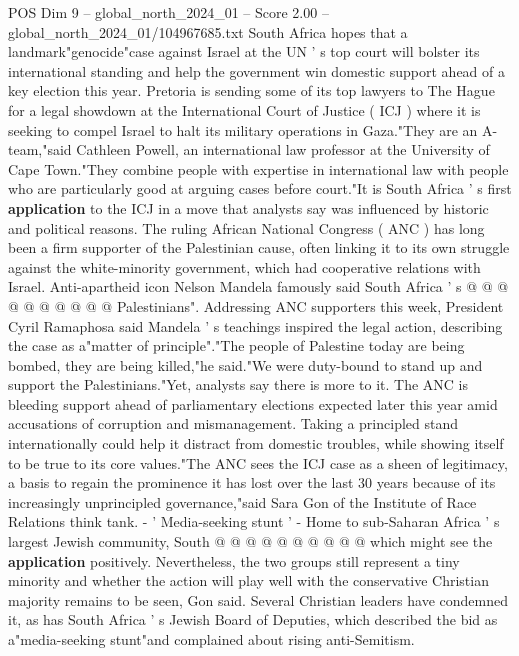 \begin{textsample}{POS Dim 9 – global\_north\_2024\_01 – Score 2.00 – global\_north\_2024\_01/104967685.txt}  \label{ex:f9_pos_250}
South Africa hopes that a landmark"genocide"case against Israel at the UN ' s top court will bolster its international standing and help the government win domestic support ahead of a key election this year.
Pretoria is sending some of its top lawyers to The Hague for a legal showdown at the International Court of Justice ( ICJ ) where it is seeking to compel Israel to halt its military operations in Gaza."They are an A-team,"said Cathleen Powell, an international law professor at the University of Cape Town."They combine people with expertise in international law with people who are particularly good at arguing cases before court."It is South Africa ' s first \textbf{application} to the ICJ in a move that analysts say was influenced by historic and political reasons.
The ruling African National Congress ( ANC ) has long been a firm supporter of the Palestinian cause, often linking it to its own struggle against the white-minority government, which had cooperative relations with Israel.
Anti-apartheid icon Nelson Mandela famously said South Africa ' s @ @ @ @ @ @ @ @ @ @ Palestinians".
Addressing ANC supporters this week, President Cyril Ramaphosa said Mandela ' s teachings inspired the legal action, describing the case as a"matter of principle"."The people of Palestine today are being bombed, they are being killed,"he said."We were duty-bound to stand up and support the Palestinians."Yet, analysts say there is more to it.
The ANC is bleeding support ahead of parliamentary elections expected later this year amid accusations of corruption and mismanagement.
Taking a principled stand internationally could help it distract from domestic troubles, while showing itself to be true to its core values."The ANC sees the ICJ case as a sheen of legitimacy, a basis to regain the prominence it has lost over the last 30 years because of its increasingly unprincipled governance,"said Sara Gon of the Institute of Race Relations think tank. - ' Media-seeking stunt ' - Home to sub-Saharan Africa ' s largest Jewish community, South @ @ @ @ @ @ @ @ @ @ which might see the \textbf{application} positively.
Nevertheless, the two groups still represent a tiny minority and whether the action will play well with the conservative Christian majority remains to be seen, Gon said.
Several Christian leaders have condemned it, as has South Africa ' s Jewish Board of Deputies, which described the bid as a"media-seeking stunt"and complained about rising anti-Semitism.

\end{textsample}
